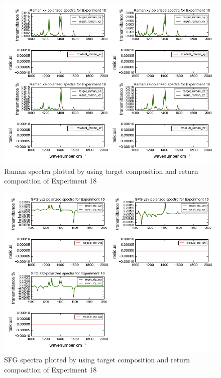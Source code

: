 \begin{figure}[!ht] \label{fig:4.6}
\centering
\includegraphics[scale=0.7]{Figures/chapter4_result_target_plotting_500datapoint_raman.png}
\caption{Raman spectra plotted by using target composition and return composition of Experiment 18} 
\end{figure}

\begin{figure}[!ht] \label{fig:4.7}
\centering
\includegraphics[scale=0.7]{Figures/chapter4_result_target_plotting_500datapoint_sfg.png}
\caption{SFG spectra plotted by using target composition and return composition of Experiment 18} 
\end{figure} 

